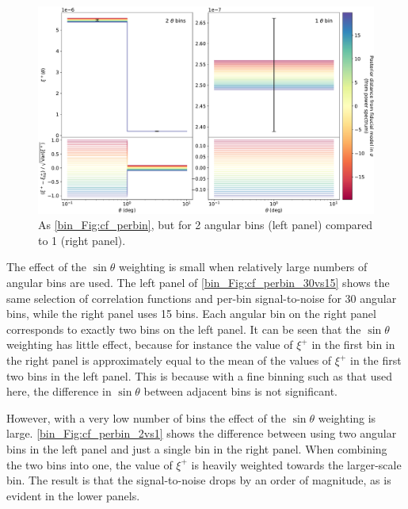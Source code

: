 \begin{figure}[tp]
\includegraphics[width=\textwidth]{cf_perbin_2vs1}
\caption{As \autoref{bin_Fig:cf_perbin}, but for 2 angular bins (left panel) compared to 1 (right panel).}
\label{bin_Fig:cf_perbin_2vs1}
\end{figure}

The effect of the $\sin{\theta}$ weighting is small when relatively large numbers of angular bins are used. The left panel of \autoref{bin_Fig:cf_perbin_30vs15} shows the same selection of correlation functions and per-bin signal-to-noise for 30 angular bins, while the right panel uses 15 bins. Each angular bin on the right panel corresponds to exactly two bins on the left panel. It can be seen that the $\sin{\theta}$ weighting has little effect, because for instance the value of $\xi^+$ in the first bin in the right panel is approximately equal to the mean of the values of $\xi^+$ in the first two bins in the left panel. This is because with a fine binning such as that used here, the difference in $\sin{\theta}$ between adjacent bins is not significant.

However, with a very low number of bins the effect of the $\sin{\theta}$ weighting is large. \autoref{bin_Fig:cf_perbin_2vs1} shows the difference between using two angular bins in the left panel and just a single bin in the right panel. When combining the two bins into one, the value of $\xi^+$ is heavily weighted towards the larger-scale bin. The result is that the signal-to-noise drops by an order of magnitude, as is evident in the lower panels.

